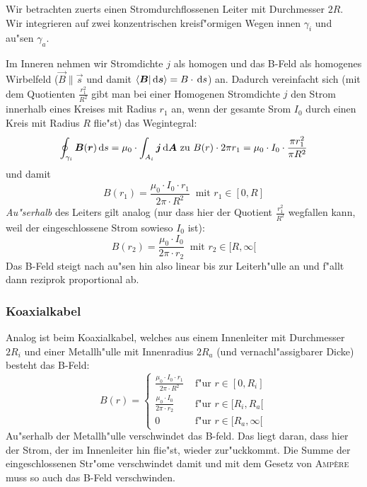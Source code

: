 Wir betrachten zuerts einen {Stromdurchflossenen Leiter} mit
Durchmesser $2R$.  Wir
integrieren auf zwei konzentrischen kreisf"ormigen Wegen innen
$\gamma_i$ und au"sen $\gamma_a$.

Im Inneren nehmen wir Stromdichte $j$ als homogen und das B-Feld als
homogenes Wirbelfeld ($\vec B \parallel \vec s$ und damit $\langle
\boldsymbol{B} |\, \mathrm{d} \boldsymbol{s} \rangle = B \cdot \, \mathrm{d} s$) an. Dadurch
vereinfacht sich (mit dem Quotienten $\frac{r_1^2}{R^2}$ gibt man bei
einer Homogenen Stromdichte $j$ den Strom innerhalb eines Kreises mit
Radius $r_1$ an, wenn der gesamte Srom $I_0$ durch einen Kreis mit
Radius $R$ flie"st) das Wegintegral:
\begin{equation*}
   \label{eq:304}
   \oint_{\gamma_i} \boldsymbol{B}(\boldsymbol{r}) \, \mathrm{d} s = \mu_0 \cdot \int_{A_i} \boldsymbol{j}
   \, \mathrm{d} \boldsymbol{A} \text{ zu }
B(r) \cdot 2\pi r_1 = \mu_0 \cdot I_0 \cdot \frac{\pi r_1^2}{\pi R^2}
\end{equation*}
und damit
\begin{equation}
   \label{eq:305}
   B(r_1) = \frac{\mu_0 \cdot I_0 \cdot r_1}{2\pi \cdot R^2} ~\text{ mit
   } r_1 \in [0, R]
\end{equation}
\emph{Au"serhalb} des Leiters gilt analog (nur dass hier der Quotient
$\frac{r_1^2}{R^2}$ wegfallen kann, weil der eingeschlossene Strom sowieso $I_0$ ist):
\begin{equation}
   \label{eq:306}
   B(r_2) = \frac{ \mu_0 \cdot I_0}{2\pi \cdot r_2} ~\text{ mit } r_2
   \in [R, \infty[
\end{equation}
Das B-Feld steigt nach au"sen hin also linear bis zur Leiterh"ulle an
und f"allt dann reziprok proportional ab.

\subsubsection{Koaxialkabel}
\label{kap_koaxialkabel-1}



Analog ist beim {Koaxialkabel}, welches aus einem Innenleiter
mit Durchmesser $2R_i$ und einer Metallh"ulle mit Innenradius $2R_a$
(und vernachl"assigbarer Dicke) besteht das B-Feld:
\begin{equation}
   \label{eq:307}
   B(r) =
   \begin{cases}
      \frac{\mu_0 \cdot I_0 \cdot r_1}{2\pi \cdot R^2}  & \text{ f"ur
   } r \in [0, R_i]\\
\frac{ \mu_0 \cdot I_0}{2\pi \cdot r_2}  & \text{ f"ur } r
   \in [R_i,R_a[\\
0 & \text{ f"ur } r \in [R_a, \infty[
   \end{cases}
\end{equation}
Au"serhalb der Metallh"ulle verschwindet das B-feld. Das liegt
daran, dass hier der Strom, der im Innenleiter hin flie"st, wieder
zur"uckkommt. Die Summe der eingeschlossenen Str"ome verschwindet damit
und mit dem Gesetz von \textsc{Amp\`ere} muss so auch das B-Feld
verschwinden.

